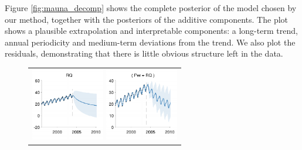 \documentclass[twoside]{article}
\begin{document}

Figure \ref{fig:mauna_decomp} shows the complete posterior of the model chosen by our method, together with the posteriors of the additive components.
The plot shows a plausible extrapolation and interpretable components: a long-term trend, annual periodicity and medium-term deviations from the trend.
We also plot the residuals, demonstrating that there is little obvious structure left in the data.

\begin{figure}[h!]
\centering
\newcommand{\wmg}{0.39\columnwidth}  %
\newcommand{\hmg}{3.2cm}  %
\begin{tabular}{c}
\hspace{-0.7cm} \includegraphics[width=\wmg,height=\hmg]{../figures/decomposition/11-Feb-v4-03-mauna2003-s_max_level_0/03-mauna2003-s_all_small} 
\hspace{-0.7cm} \includegraphics[width=\wmg,height=\hmg]{../figures/decomposition/11-Feb-v4-03-mauna2003-s_max_level_1/03-mauna2003-s_all_small}

\end{tabular}
\end{figure}
\end{document}
